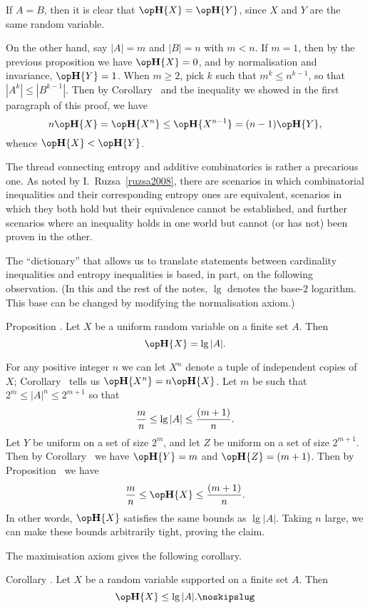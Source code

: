 If $A = B$, then it is clear that $\Eta\{X\} = \Eta\{Y\}$, since $X$ and $Y$
are the same random variable.

On the other hand, say $|A| = m$ and $|B| = n$ with $m<n$. If $m=1$, then by the previous proposition
we have $\Eta\{X\} = 0$, and by normalisation and invariance, $\Eta\{Y\} = 1$.
When $m\ge 2$, pick $k$ such that $m^k \le n^{k-1}$, so that $|A^k| \le |B^{k-1}|$.
Then by Corollary~{\corxn} and the inequality we showed in the first paragraph of this proof, we have
$$n\Eta\{X\} = \Eta\{X^n\} \le \Eta\{X^{n-1}\} = (n-1)\Eta\{Y\},$$
whence $\Eta\{X\} < \Eta\{Y\}$.\slug

The thread connecting entropy and additive combinatorics is rather a precarious one.
As noted by I.~Ruzsa~\ref{ruzsa2008}, there are scenarios in which combinatorial inequalities and
their corresponding entropy ones
are equivalent, scenarios in which they both hold but their equivalence cannot be established,
and further scenarios where an inequality holds in one world but cannot (or has not) been proven in the other.

The ``dictionary'' that allows us to translate
statements between cardinality inequalities and entropy inequalities is based, in part, on the following
observation. (In this and the rest of the notes, $\lg$ denotes the base-$2$ logarithm. This base can
be changed by modifying the normalisation axiom.)

\edef\proplogeq{\the\sectcount.\the\thmcount}
\proclaim Proposition \advthm. Let $X$ be a uniform random variable on a finite set $A$.
Then
$$\Eta\{X\} = \lg |A|.$$

\proof For any positive integer $n$ we can let
$X^n$ denote a tuple of independent copies of $X$; Corollary~{\corxn} tells us $\Eta\{X^n\} = n\Eta\{X\}$.
Let $m$ be such that $2^m \le |A|^n \le 2^{m+1}$ so that
$${m\over n} \le \lg |A| \le {(m+1)\over n}.$$
Let $Y$ be uniform on a set of size $2^m$,
and let $Z$ be uniform on a set of size $2^{m+1}$. Then by Corollary~{\cortwon} we have
$\Eta\{Y\} = m $ and $\Eta\{Z\} = (m+1)$. Then by Proposition~{\propunifineq}
we have
$${m\over n} \le \Eta\{X\} \le {(m+1)\over n}.$$
In other words, $\Eta\{X\}$ satisfies the same bounds as $\lg |A|$. Taking $n$ large, we can make
these bounds arbitrarily tight, proving the claim.\slug

The maximisation axiom gives the following corollary.

\edef\corlogineq{\the\sectcount.\the\thmcount}
\proclaim Corollary \advthm. Let $X$ be a random variable supported on a finite set $A$.
Then
$$\Eta\{X\} \le \lg |A|.\noskipslug$$

